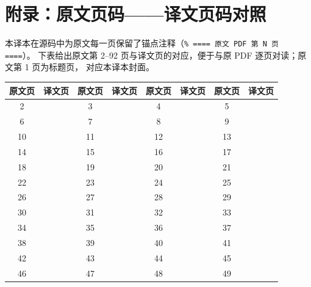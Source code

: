 \clearpage
\section*{附录：原文页码——译文页码对照}

本译本在源码中为原文每一页保留了锚点注释（\texttt{\% ==== 原文 PDF 第 N 页 ====}）。
下表给出原文第 2--92 页与译文页的对应，便于与原 PDF 逐页对读；原文第 1 页为标题页，
对应本译本封面。

\begin{center}
\small
\setlength{\tabcolsep}{4pt}
\renewcommand{\arraystretch}{1.12}
\begin{tabular}{*{8}{c}}
\toprule
原文页 & 译文页 & 原文页 & 译文页 & 原文页 & 译文页 & 原文页 & 译文页\\
\midrule
2 & \pageref{op:2} & 3 & \pageref{op:3} & 4 & \pageref{op:4} & 5 & \pageref{op:5}\\
6 & \pageref{op:6} & 7 & \pageref{op:7} & 8 & \pageref{op:8} & 9 & \pageref{op:9}\\
10 & \pageref{op:10} & 11 & \pageref{op:11} & 12 & \pageref{op:12} & 13 & \pageref{op:13}\\
14 & \pageref{op:14} & 15 & \pageref{op:15} & 16 & \pageref{op:16} & 17 & \pageref{op:17}\\
18 & \pageref{op:18} & 19 & \pageref{op:19} & 20 & \pageref{op:20} & 21 & \pageref{op:21}\\
22 & \pageref{op:22} & 23 & \pageref{op:23} & 24 & \pageref{op:24} & 25 & \pageref{op:25}\\
26 & \pageref{op:26} & 27 & \pageref{op:27} & 28 & \pageref{op:28} & 29 & \pageref{op:29}\\
30 & \pageref{op:30} & 31 & \pageref{op:31} & 32 & \pageref{op:32} & 33 & \pageref{op:33}\\
34 & \pageref{op:34} & 35 & \pageref{op:35} & 36 & \pageref{op:36} & 37 & \pageref{op:37}\\
38 & \pageref{op:38} & 39 & \pageref{op:39} & 40 & \pageref{op:40} & 41 & \pageref{op:41}\\
42 & \pageref{op:42} & 43 & \pageref{op:43} & 44 & \pageref{op:44} & 45 & \pageref{op:45}\\
46 & \pageref{op:46} & 47 & \pageref{op:47} & 48 & \pageref{op:48} & 49 & \pageref{op:49}\\

\end{tabular}
\end{center}

